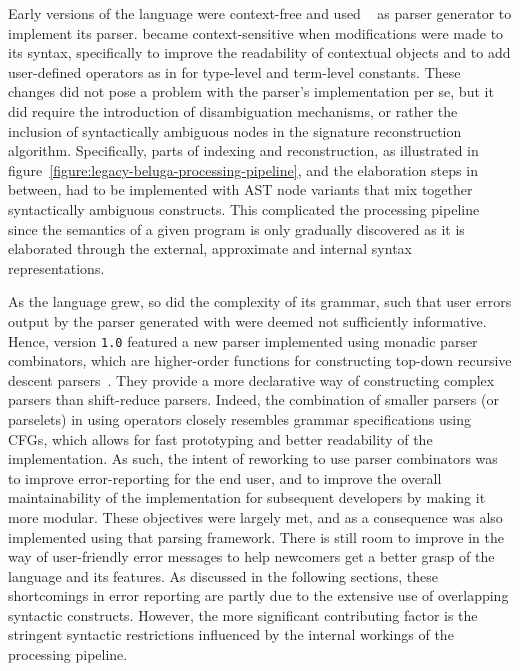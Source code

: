 Early versions of the \Beluga language were context-free and used \CamlpFour~\cite{de2003camlp4} as parser generator to implement its parser.
\Beluga became context-sensitive when modifications were made to its syntax, specifically to improve the readability of contextual objects and to add user-defined operators as in \Twelf for \LF type-level and term-level constants.
These changes did not pose a problem with the parser's implementation per se, but it did require the introduction of disambiguation mechanisms, or rather the inclusion of syntactically ambiguous nodes in the signature reconstruction algorithm.
Specifically, parts of indexing and reconstruction, as illustrated in figure~\ref{figure:legacy-beluga-processing-pipeline}, and the elaboration steps in between, had to be implemented with \ac{AST} node variants that mix together syntactically ambiguous constructs.
This complicated the processing pipeline since the semantics of a given \Beluga program is only gradually discovered as it is elaborated through the external, approximate and internal syntax representations.


As the \Beluga language grew, so did the complexity of its grammar, such that user errors output by the parser generated with \CamlpFour were deemed not sufficiently informative.
Hence, \Beluga version \texttt{1.0} featured a new parser implemented using monadic parser combinators, which are higher-order functions for constructing top-down recursive descent parsers~\cite{Burge1975-BURRPT, hutton1996monadic, leijen2001parsec, generalparsercombs, afroozeh2019practical}.
They provide a more declarative way of constructing complex parsers than shift-reduce parsers.
Indeed, the combination of smaller parsers (or parselets) in \OCaml using operators closely resembles grammar specifications using \acp{CFG}, which allows for fast prototyping and better readability of the implementation.
As such, the intent of reworking \Beluga to use parser combinators was to improve error-reporting for the end user, and to improve the overall maintainability of the implementation for subsequent developers by making it more modular.
These objectives were largely met, and as a consequence \Harpoon was also implemented using that parsing framework.
There is still room to improve in the way of user-friendly error messages to help newcomers get a better grasp of the language and its features.
As discussed in the following sections, these shortcomings in error reporting are partly due to the extensive use of overlapping syntactic constructs.
However, the more significant contributing factor is the stringent syntactic restrictions influenced by the internal workings of the processing pipeline.

